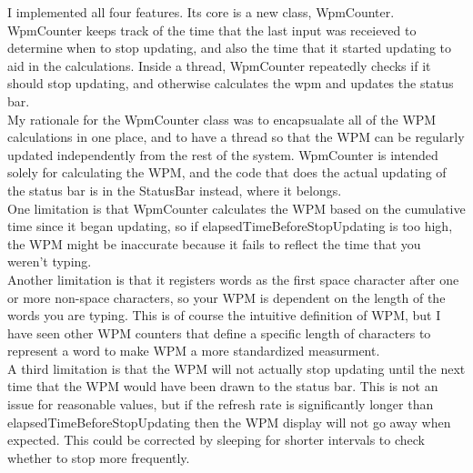 \documentclass[12pt]{article}
\begin{document}
\maketitle

I implemented all four features.
Its core is a new class, WpmCounter. WpmCounter keeps track
of the time that the last input was receieved to determine when to stop
updating, and also the time that it started updating to aid in the
calculations. Inside a thread, WpmCounter repeatedly checks if it should stop
updating, and otherwise calculates the wpm and updates the status bar. \\

My rationale for the WpmCounter class was to encapsualate all of the WPM
calculations in one place, and to have a thread so that the WPM can be
regularly updated independently from the rest of the system. WpmCounter is
intended solely for calculating the WPM, and the code that does the actual
updating of the status bar is in the StatusBar instead, where it belongs. \\

One limitation is that WpmCounter calculates the WPM based on the cumulative
time since it began updating, so if elapsedTimeBeforeStopUpdating is too high,
the WPM might be inaccurate because it fails to reflect the time that you
weren't typing. \\

Another limitation is that it registers words as the first
space character after one or more non-space characters, so your WPM is
dependent on the length of the words you are typing. This is of course the
intuitive definition of WPM, but I have seen other WPM counters that define
a specific length of characters to represent a word to make WPM a more
standardized measurment. \\

A third limitation is that the WPM will not actually stop updating until the next time that the WPM would have been drawn to the status bar. This is not an issue for reasonable values, but if the refresh rate is significantly longer than elapsedTimeBeforeStopUpdating then the WPM display will not go away when expected. This could be corrected by sleeping for shorter intervals to check whether to stop more frequently. \\
\end{document}

